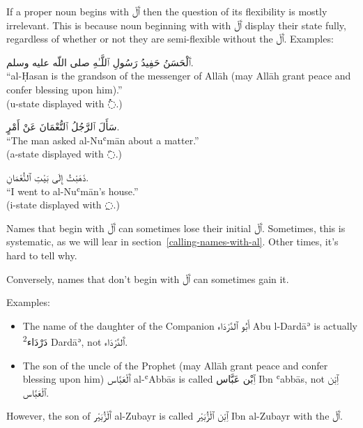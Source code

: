 \documentclass[
  10pt,
]{book}
\begin{document}
If a proper noun begins with \foreignlanguage{arabic}{ٱَلْ} then the question of its flexibility is mostly irrelevant.
This is because noun beginning with with \foreignlanguage{arabic}{ٱَلْ} display their state fully, regardless of whether or not they are semi-flexible without the \foreignlanguage{arabic}{ٱَلْ}. Examples:

\foreignlanguage{arabic}{ٱَلْحَسَنُ حَفِيدُ رَسُولِ ٱللَّـٰهِ صلى اللّه عليه وسلم.}\\
\enquote{al-Ḥasan is the grandson of the messenger of Allāh (may Allāh grant peace and confer blessing upon him).}\\
(u-state displayed with \foreignlanguage{arabic}{◌ُ}.)

\foreignlanguage{arabic}{سَأَلَ ٱلرَّجُلُ ٱلنُّعْمَانَ عَنْ أَمْرٍ.}\\
\enquote{The man asked al-Nuʿmān about a matter.}\\
(a-state displayed with \foreignlanguage{arabic}{◌َ}.)

\foreignlanguage{arabic}{ذَهَبْتُ إِلَى بَيْتِ ٱلنُّعْمَانِ.}\\
\enquote{I went to al-Nuʿmān's house.}\\
(i-state displayed with \foreignlanguage{arabic}{◌ِ}.)

Names that begin with \foreignlanguage{arabic}{ٱَلْ} can sometimes lose their initial \foreignlanguage{arabic}{ٱَلْ}. Sometimes, this is systematic, as we will lear in section~\ref{calling-names-with-al}.
Other times, it's hard to tell why.

Conversely, names that don't begin with \foreignlanguage{arabic}{ٱَلْ} can sometimes gain it.

Examples:

\begin{itemize}
\item
  The name of the daughter of the Companion \foreignlanguage{arabic}{أَبُو ٱلدَّرْدَاء} Abu l-Dardāʾ is actually \foreignlanguage{arabic}{دَرْدَاء\textsuperscript{2}} Dardāʾ, not \foreignlanguage{arabic}{ٱَلدَّرْدَاء}.
\item
  The son of the uncle of the Prophet
  (may Allāh grant peace and confer blessing upon him)
  \foreignlanguage{arabic}{ٱَلْعَبَّاس} al-ʿAbbās
  is called
  \foreignlanguage{arabic}{ٱِبْن عَبَّاس} Ibn ʿabbās, not \foreignlanguage{arabic}{ٱِبْن ٱلْعَبَّاس}.
\end{itemize}

However, the son of
\foreignlanguage{arabic}{ٱَلْزُّبَيْر} al-Zubayr\textbar{}
is called
\foreignlanguage{arabic}{ٱِبْن ٱلْزُّبَيْر} Ibn al-Zubayr with the \foreignlanguage{arabic}{ٱَلْ}.
\end{document}
